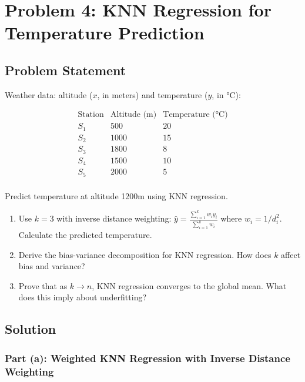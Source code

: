 \documentclass[12pt]{article}
\begin{document}
\newpage
\section{Problem 4: KNN Regression for Temperature Prediction}

\subsection{Problem Statement}

Weather data: altitude (\(x\), in meters) and temperature (\(y\), in °C):

\[\begin{array}{c|cc}
\text{Station} & \text{Altitude (m)} & \text{Temperature (°C)} \\
\hline
S_1 & 500 & 20 \\
S_2 & 1000 & 15 \\
S_3 & 1800 & 8 \\
S_4 & 1500 & 10 \\
S_5 & 2000 & 5 \\
\end{array}\]

Predict temperature at altitude 1200m using KNN regression.

\begin{enumerate}
\item[(a)] Use \(k=3\) with inverse distance weighting: \(\hat{y} = \frac{\sum_{i=1}^k w_i y_i}{\sum_{i=1}^k w_i}\) where \(w_i = 1/d_i^2\). Calculate the predicted temperature.
\item[(b)] Derive the bias-variance decomposition for KNN regression. How does \(k\) affect bias and variance?
\item[(c)] Prove that as \(k \to n\), KNN regression converges to the global mean. What does this imply about underfitting?
\end{enumerate}

\subsection{Solution}

\subsubsection{Part (a): Weighted KNN Regression with Inverse Distance Weighting}
\end{document}

